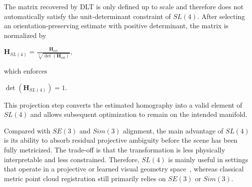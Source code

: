 The matrix recovered by DLT is only defined up to scale and therefore does not automatically satisfy the unit-determinant constraint of $SL(4)$. After selecting an orientation-preserving estimate with positive determinant, the matrix is normalized by
\begin{center}
    $\displaystyle \mathbf{H}_{SL(4)} = \frac{\mathbf{H}_{\mathrm{est}}}{\sqrt[4]{\det(\mathbf{H}_{\mathrm{est}})}},$
\end{center}
which enforces
\begin{center}
    $\displaystyle \det(\mathbf{H}_{SL(4)}) = 1.$
\end{center}
This projection step converts the estimated homography into a valid element of $SL(4)$ and allows subsequent optimization to remain on the intended manifold.

Compared with $SE(3)$ and $Sim(3)$ alignment, the main advantage of $SL(4)$ is its ability to absorb residual projective ambiguity before the scene has been fully metricized. The trade-off is that the transformation is less physically interpretable and less constrained. Therefore, $SL(4)$ is mainly useful in settings that operate in a projective or learned visual geometry space~\cite{maggio2025vggtslam}, whereas classical metric point cloud registration still primarily relies on $SE(3)$ or $Sim(3)$.

